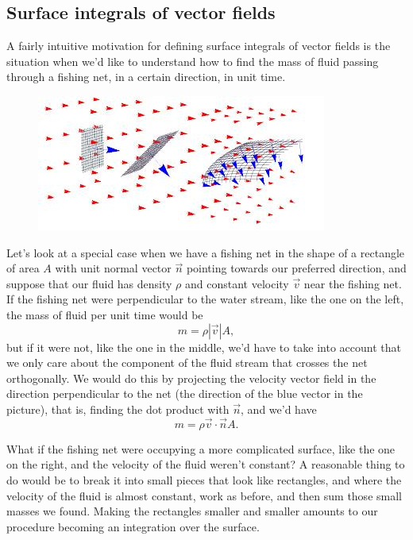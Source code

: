 \documentclass[12pt]{article}
\begin{document}
\subsection*{Surface integrals of vector fields}

A fairly intuitive motivation for defining surface integrals of vector fields is the situation when we'd like to understand how to find the mass of fluid passing through a fishing net, in a certain direction, in unit time.

\begin{figure}[h]
\begin{center}
\includegraphics[scale=.6]{stream.jpeg}
\end{center}
\end{figure}

Let's look at a special case when we have a fishing net in the shape of a rectangle of area $A$ with unit normal vector $\vec{n}$ pointing towards our preferred direction, and suppose that our fluid has density $\rho$ and constant velocity $\vec{v}$ near the fishing net. If the fishing net were perpendicular to the water stream, like the one on the left, the mass of fluid per unit time would be $$m=\rho|\vec{v}|A,$$ but if it were not, like the one in the middle, we'd have to take into account that we only care about the component of the fluid stream that crosses the net orthogonally. We would do this by projecting the velocity vector field in the direction perpendicular to the net (the direction of the blue vector in the picture), that is, finding the dot product with $\vec{n}$, and we'd have $$m=\rho \vec{v}\cdot\vec{n} A.$$

What if the fishing net were occupying a more complicated surface, like the one on the right, and the velocity of the fluid weren't constant? A reasonable thing to do would be to break it into small pieces that look like rectangles, and where the velocity of the fluid is almost constant, work as before, and then sum those small masses we found. Making the rectangles smaller and smaller amounts to our procedure becoming an integration over the surface.
\end{document}

